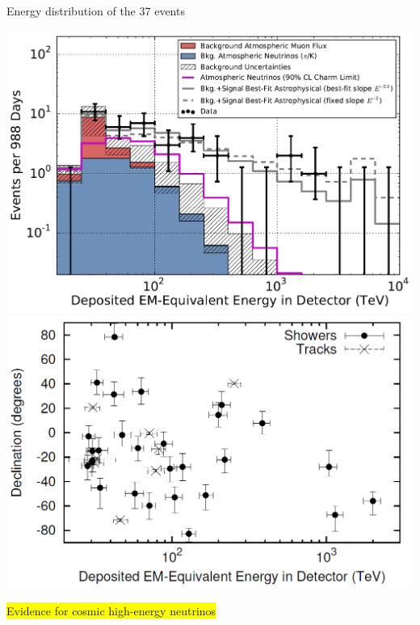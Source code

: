 \Tr
\onecolumn
\begin{center}
{\blue Energy distribution of the 37 events}
\end{center}
\includegraphics[keepaspectratio,width=13.5cm]{hese-e}
\includegraphics[keepaspectratio,width=13.5cm]{hese-decl-vs-e}
\begin{center}
\colorbox{yellow}{Evidence for cosmic high-energy neutrinos}
\end{center}

